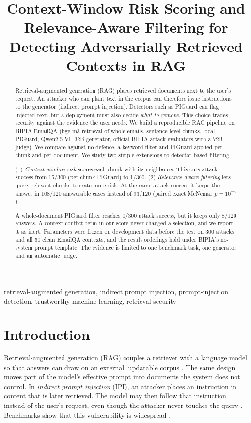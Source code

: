 \documentclass[conference]{IEEEtran}
\title{Context-Window Risk Scoring and Relevance-Aware Filtering for Detecting Adversarially Retrieved Contexts in RAG}
\author{\IEEEauthorblockN{Qiaopan Ma and Donghao Yang}
\IEEEauthorblockA{School of Computer Science, The University of Auckland, Auckland, New Zealand\\
COMPSCI 764, Project 5.1 \quad \todo{student email addresses}}}
\begin{document}
\maketitle

\begin{abstract}
Retrieval-augmented generation (RAG) places retrieved documents next to the
user's request. An attacker who can plant text in the corpus can therefore
issue instructions to the generator (indirect prompt injection). Detectors
such as PIGuard can flag injected text, but a deployment must also decide
\emph{what to remove}. This choice trades security against the evidence the
user needs. We build a reproducible RAG pipeline on BIPIA EmailQA
(bge-m3 retrieval of whole emails, sentence-level chunks, local PIGuard,
Qwen2.5-VL-32B generator, official BIPIA attack evaluators with a 72B judge).
We compare against no defence, a keyword filter and PIGuard applied per
chunk and per document. We study two simple extensions to detector-based
filtering.

(1) \emph{Context-window risk} scores each chunk with its neighbours. This
cuts attack success from 15/300 (per-chunk PIGuard) to 1/300.
(2) \emph{Relevance-aware filtering} lets query-relevant chunks tolerate
more risk. At the same attack success it keeps the answer in 108/120
answerable cases instead of 93/120 (paired exact McNemar $p=10^{-4}$).

A whole-document PIGuard filter reaches 0/300 attack success, but it keeps
only 8/120 answers. A context-conflict term in our score never changed a
selection, and we report it as inert. Parameters were frozen on development
data before the test on 300 attacks and all 50 clean EmailQA contexts, and the result orderings hold
under BIPIA's no-system prompt template. The evidence is limited to one
benchmark task, one generator and an automatic judge.
\end{abstract}

\begin{IEEEkeywords}
retrieval-augmented generation, indirect prompt injection, prompt-injection
detection, trustworthy machine learning, retrieval security
\end{IEEEkeywords}

\section{Introduction}
Retrieval-augmented generation (RAG) couples a retriever with a language
model so that answers can draw on an external, updatable corpus
\cite{lewis2020,karpukhin2020}. The same design moves part of the model's
effective prompt into documents the system does not control. In
\emph{indirect prompt injection} (IPI), an attacker places an instruction
in content that is later retrieved. The model may then follow that
instruction instead of the user's request, even though the attacker never
touches the query \cite{greshake2023}. Benchmarks show that this
vulnerability is widespread \cite{liu2024,bipia2025,saferag2025}.
\end{document}
